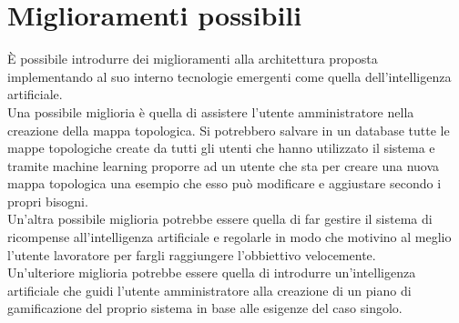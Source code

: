 \section{Miglioramenti possibili}

È possibile introdurre dei miglioramenti alla architettura proposta implementando al suo interno tecnologie emergenti come quella dell'intelligenza artificiale.\\
Una possibile miglioria è quella di assistere l'utente amministratore nella creazione della mappa topologica. Si potrebbero salvare in un database tutte le mappe topologiche create da tutti gli utenti che hanno utilizzato il sistema e tramite machine learning proporre ad un utente che sta per creare una nuova mappa topologica una esempio che esso può modificare e aggiustare secondo i propri bisogni.\\
Un'altra possibile miglioria potrebbe essere quella di far gestire il sistema di ricompense all'intelligenza artificiale e regolarle in modo che motivino al meglio l'utente lavoratore per fargli raggiungere l'obbiettivo velocemente.\\
Un'ulteriore miglioria potrebbe essere quella di introdurre un'intelligenza artificiale che guidi l'utente amministratore alla creazione di un piano di gamificazione del proprio sistema in base alle esigenze del caso singolo.
